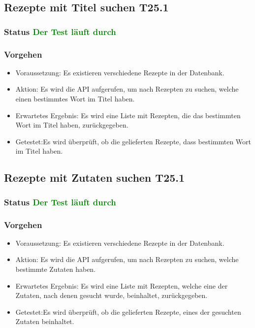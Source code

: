\subsection{Rezepte mit Titel suchen T25.1}
\subsubsection{Status \textcolor{green}{ Der Test läuft durch} }
\subsubsection{Vorgehen}
\begin{itemize}
	\item Voraussetzung: Es existieren verschiedene Rezepte in der Datenbank.
	\item Aktion: Es wird die API aufgerufen, um nach Rezepten zu suchen, welche einen bestimmtes Wort im Titel haben.
	\item Erwartetes Ergebnis: Es wird eine Liste mit Rezepten, die das bestimmten Wort im Titel haben, zurückgegeben.
	\item Getestet:Es wird überprüft, ob die gelieferten Rezepte, dass bestimmten Wort im Titel haben.
\end{itemize}

\subsection{Rezepte mit Zutaten suchen T25.1}
\subsubsection{Status \textcolor{green}{ Der Test läuft durch} }
\subsubsection{Vorgehen}
\begin{itemize}
	\item Voraussetzung: Es existieren verschiedene Rezepte in der Datenbank.
	\item Aktion: Es wird die API aufgerufen, um nach Rezepten zu suchen, welche bestimmte Zutaten haben.
	\item Erwartetes Ergebnis: Es wird eine Liste mit Rezepten, welche eine der Zutaten, nach denen gesucht wurde, beinhaltet, zurückgegeben.
	\item Getestet:Es wird überprüft, ob die gelieferten Rezepte, eines der gesuchten Zutaten beinhaltet.
\end{itemize}

